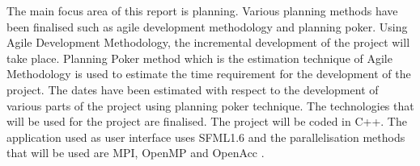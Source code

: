 The main focus area of this report is planning. Various planning  methods have been finalised such as agile development methodology and planning poker.
Using Agile Development Methodology, the incremental  development of the project will take place. Planning Poker method  which is the estimation technique of Agile Methodology is used to estimate the time requirement for the development of the project. The dates have been estimated with respect to the development of various parts of the project using planning poker technique. 
The technologies that will be used for the project are finalised. The project will be coded in C++. The application used as user interface uses SFML1.6 and the parallelisation methods that will be used are MPI, OpenMP and OpenAcc .
